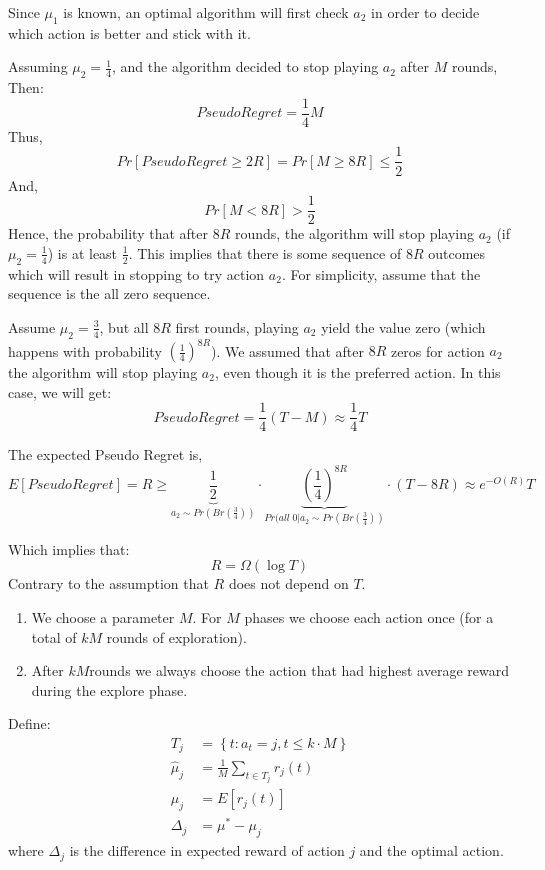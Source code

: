 Since $\mu_1$ is known, an optimal algorithm will first check $a_2$
in order to decide which action is better and stick with it.

Assuming $\mu_2 = \frac{1}{4}$, and the algorithm decided to stop
playing $a_2$ after $M$ rounds, Then:
\[
Pseudo Regret = \frac{1}{4}M
\]
Thus,
\[
Pr\left[Pseudo Regret\ge 2R \right] = Pr\left[ M\ge 8R
\right]\le\frac{1}{2}
\]
And,
\[
Pr\left[M < 8R \right]>\frac{1}{2}
\]
Hence, the probability that after $8R$ rounds, the algorithm will
stop playing $a_2$ (if $\mu_2 = \frac{1}{4}$) is at least
$\frac{1}{2}$. This implies that there is some sequence of $8R$
outcomes which will result in stopping to try action $a_2$. For
simplicity, assume that the sequence is the all zero sequence.

Assume $\mu_2 = \frac{3}{4}$, but all $8R$ first rounds, playing
$a_2$ yield the value zero (which happens with probability
$\left(\frac{1}{4}\right)^{8R}$). We assumed that after $8R$ zeros
for action $a_2$ the algorithm will stop playing $a_2$, even though
it is the preferred action. In this case, we will get:
\[
Pseudo Regret = \frac{1}{4} (T - M) \approx \frac{1}{4}T
\]

The expected Pseudo Regret is,
\[
E\left[Pseudo Regret\right] = R \geq
\underbrace{\frac{1}{2}}_{a_{2}\sim Pr(Br\left(\frac{3}{4}\right))}
\cdot \underbrace{\left(\frac{1}{4}\right)^{8R}}_{Pr(all \; 0 |
a_{2}\sim Pr(Br\left(\frac{3}{4}\right))} \cdot (T - 8R) \approx
e^{-O(R)}T
\]

Which implies that:
\[
R=\Omega\left(\log T\right)
\]
Contrary to the assumption that $R$ does not depend on $T$.


\begin{enumerate}
%
\item We choose a parameter $M$.
%
For $M$ phases we choose each action once (for a total of $kM$
rounds of exploration).
%
\item After $kM$rounds we always choose the action that had highest
average reward during the explore phase.
\end{enumerate}

Define:
\begin{align*}
T_{j}&= \left\{ t:a_t=j,t\le k\cdot M\right\}\\
\hat{\mu}_{j}&=\frac{1}{M} \sum_{t\in T_{j}}r_{j}(t)\\
\mu_{j}&=E[r_{j}(t)]\\
\Delta_{j}&=\mu^{*}-\mu_{j}
\end{align*}
where $\Delta_j$ is the difference in expected reward of action $j$
and the optimal action.

